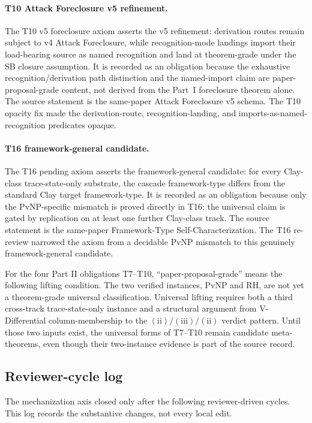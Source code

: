 \documentclass[11pt]{article}
\newcommand{\SigPattern}{$\mathrm{(ii)}/\mathrm{(iii)}/\mathrm{(ii)}$}
\theoremstyle{definition}
\begin{document}
\paragraph{T10 Attack Foreclosure v5 refinement.}
The T10 v5 foreclosure axiom asserts the v5 refinement: derivation
routes remain subject to v4
Attack Foreclosure, while recognition-mode landings import their
load-bearing source as named recognition and land at theorem-grade under
the SB closure assumption.  It is recorded as an obligation because the
exhaustive recognition/derivation path distinction and the named-import
claim are paper-proposal-grade content, not derived from the Part~I
foreclosure theorem alone.  The source statement is the same-paper
Attack Foreclosure v5 schema.  The T10 opacity fix made the
derivation-route, recognition-landing, and imports-as-named-recognition
predicates opaque.

\paragraph{T16 framework-general candidate.}
The T16 pending axiom asserts the framework-general candidate: for every
Clay-class
trace-state-only substrate, the cascade framework-type differs from the
standard Clay target framework-type.  It is recorded as an obligation
because only the PvNP-specific mismatch is proved directly in T16; the
universal claim is gated by replication on at least one further
Clay-class track.  The source statement is the same-paper
Framework-Type Self-Characterization.  The T16 re-review narrowed the
axiom from a decidable PvNP mismatch to this genuinely
framework-general candidate.

For the four Part II obligations T7--T10, ``paper-proposal-grade''
means the following lifting condition.  The two verified instances,
PvNP and RH, are not yet a theorem-grade universal classification.  Universal lifting requires both a third cross-track
trace-state-only instance and a structural argument from
V-Differential column-membership to the \SigPattern{} verdict pattern.
Until those two inputs exist, the universal forms of T7--T10 remain
candidate meta-theorems, even though their two-instance evidence is part
of the source record.

\subsection{Reviewer-cycle log}\label{app:formalization:reviewer-log}

The mechanization axis closed only after the following reviewer-driven
cycles.  This log records the substantive changes, not every local edit.
\end{document}
